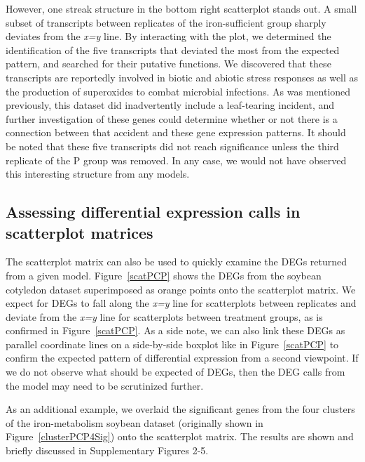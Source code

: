 \documentclass{bioinfo}
\begin{document}
However, one streak structure in the bottom right scatterplot stands out. A small subset of transcripts between replicates of the iron-sufficient group sharply deviates from the \textit{x=y} line. By interacting with the plot, we determined the identification of the five transcripts that deviated the most from the expected pattern, and searched for their putative functions. We discovered that these transcripts are reportedly involved in biotic and abiotic stress responses as well as the production of superoxides to combat microbial infections. As was mentioned previously, this dataset did inadvertently include a leaf-tearing incident, and further investigation of these genes could determine whether or not there is a connection between that accident and these gene expression patterns. It should be noted that these five transcripts did not reach significance unless the third replicate of the P group was removed. In any case, we would not have observed this interesting structure from any models.

\subsection{Assessing differential expression calls in scatterplot matrices}

The scatterplot matrix can also be used to quickly examine the DEGs returned from a given model. Figure~\ref{scatPCP} shows the DEGs from the soybean cotyledon dataset superimposed as orange points onto the scatterplot matrix. We expect for DEGs to fall along the \textit{x=y} line for scatterplots between replicates and deviate from the \textit{x=y} line for scatterplots between treatment groups, as is confirmed in Figure~\ref{scatPCP}. As a side note, we can also link these DEGs as parallel coordinate lines on a side-by-side boxplot like in Figure~\ref{scatPCP} to confirm the expected pattern of differential expression from a second viewpoint. If we do not observe what should be expected of DEGs, then the DEG calls from the model may need to be scrutinized further.

As an additional example, we overlaid the significant genes from the four clusters of the iron-metabolism soybean dataset (originally shown in Figure~\ref{clusterPCP4Sig}) onto the scatterplot matrix. The results are shown and briefly discussed in Supplementary Figures 2-5. 

\end{document}

